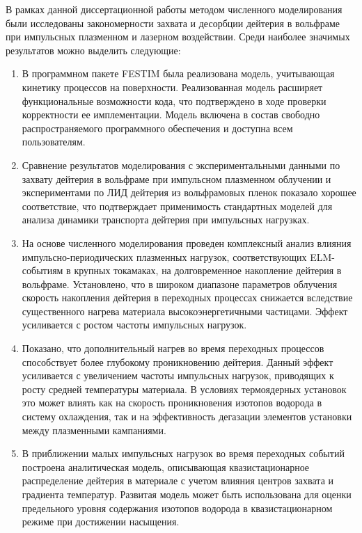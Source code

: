 В рамках данной диссертационной работы методом численного моделирования были исследованы закономерности захвата и десорбции дейтерия в вольфраме при импульсных плазменном и лазерном воздействии. Среди наиболее значимых результатов можно выделить следующие:
\begin{enumerate}
  \item В программном пакете FESTIM была реализована модель, учитывающая кинетику процессов на поверхности. Реализованная модель расширяет функциональные возможности кода, что подтверждено в ходе проверки корректности ее имплементации. Модель включена в состав свободно распространяемого программного обеспечения и доступна всем пользователям.
  \item Сравнение результатов моделирования с экспериментальными данными по захвату дейтерия в вольфраме при импульсном плазменном облучении и экспериментами по ЛИД дейтерия из вольфрамовых пленок показало хорошее соответствие, что подтверждает применимость стандартных моделей для анализа динамики транспорта дейтерия при импульсных нагрузках.
  \item На основе численного моделирования проведен комплексный анализ влияния импульсно-периодических плазменных нагрузок, соответствующих ELM-событиям в крупных токамаках, на долговременное накопление дейтерия в вольфраме. Установлено, что в широком диапазоне параметров облучения скорость накопления дейтерия в переходных процессах снижается вследствие существенного нагрева материала высокоэнергетичными частицами. Эффект усиливается с ростом частоты импульсных нагрузок. 
  \item Показано, что дополнительный нагрев во время переходных процессов способствует более глубокому проникновению дейтерия. Данный эффект усиливается с увеличением частоты импульсных нагрузок, приводящих к росту средней температуры материала. В условиях термоядерных установок это может влиять как на скорость проникновения изотопов водорода в систему охлаждения, так и на эффективность дегазации элементов установки между плазменными кампаниями.
  \item В приближении малых импульсных нагрузок во время переходных событий построена аналитическая модель, описывающая квазистационарное распределение дейтерия в материале с учетом влияния центров захвата и градиента температур. Развитая модель может быть использована для оценки предельного уровня содержания изотопов водорода в квазистационарном режиме при достижении насыщения.

\end{enumerate}
